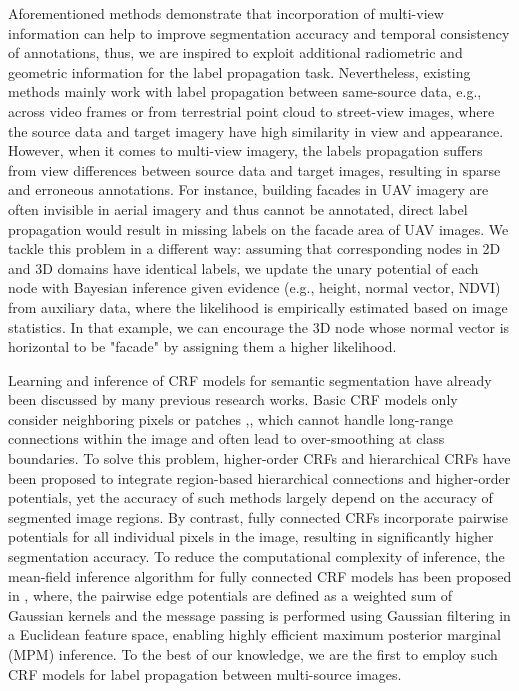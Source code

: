 Aforementioned methods demonstrate that incorporation of multi-view information can help to improve segmentation accuracy and temporal consistency of annotations, thus, we are inspired to exploit additional radiometric and geometric information for the label propagation task. Nevertheless, existing methods mainly work with label propagation between same-source data, e.g., across video frames or from terrestrial point cloud to street-view images, where the source data and target imagery have high similarity in view and appearance. However, when it comes to multi-view imagery, the labels propagation suffers from view differences between source data and target images, resulting in sparse and erroneous annotations. For instance, building facades in UAV imagery are often invisible in aerial imagery and thus cannot be annotated, direct label propagation would result in missing labels on the facade area of UAV images. We tackle this problem in a different way: assuming that corresponding nodes in 2D and 3D domains have identical labels, we update the unary potential of each node with Bayesian inference given evidence (e.g., height, normal vector, NDVI) from auxiliary data, where the likelihood is empirically estimated based on image statistics. In that example, we can encourage the 3D node whose normal vector is horizontal to be "facade" by assigning them a higher likelihood.   

Learning and inference of CRF models for semantic segmentation have already been discussed by many previous research works. Basic CRF models only consider neighboring pixels or patches \cite{shotton2009textonboost},\cite{fulkerson2009Class}, which cannot handle long-range connections within the image and often lead to over-smoothing at class boundaries. To solve this problem, higher-order CRFs \cite{Kohli2008robust} and hierarchical CRFs \cite{Ladicky2009hierarchical} have been proposed to integrate region-based hierarchical connections and higher-order potentials, yet the accuracy of such methods largely depend on the accuracy of segmented image regions. By contrast, fully connected CRFs incorporate pairwise potentials for all individual pixels in the image, resulting in significantly higher segmentation accuracy. To reduce the computational complexity of inference, the mean-field inference algorithm for fully connected CRF models has been proposed in \cite{crf2012}, where, the pairwise edge potentials are defined as a weighted sum of Gaussian kernels and the message passing is performed using Gaussian filtering in a Euclidean feature space, enabling highly efficient maximum posterior marginal (MPM) inference. To the best of our knowledge, we are the first to employ such CRF models for label propagation between multi-source images.
 

